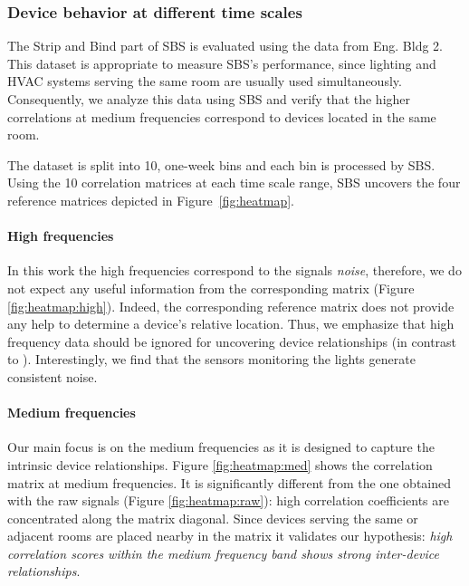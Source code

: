 \subsubsection{Device behavior at different time scales}
The Strip and Bind part of SBS is evaluated using the data from Eng. Bldg 2. %
This dataset is appropriate to measure SBS's performance, since lighting and HVAC systems serving the same room are usually used 
simultaneously.
Consequently, we analyze this data using SBS and verify that the higher correlations at medium frequencies correspond to devices located in the same room. %

The dataset is split into 10, one-week bins and each bin is processed by SBS.
Using the 10 correlation matrices at each time scale range, SBS uncovers the four reference matrices depicted in 
Figure~\ref{fig:heatmap}.

\paragraph{High frequencies}
In this work the high frequencies correspond to the signals \emph{noise}, 
therefore, we do not expect any useful information from the corresponding matrix (Figure \ref{fig:heatmap:high}).
Indeed, the corresponding reference matrix does not provide any help to determine a device's relative location.
Thus, we emphasize that high frequency data should be ignored for uncovering device relationships (in contrast to \cite{romain:iotapp12}).
Interestingly, we find that the sensors monitoring the lights generate consistent noise. %
  
\paragraph{Medium frequencies}
Our main focus is on the medium frequencies as it is designed to capture the intrinsic device relationships.
Figure \ref{fig:heatmap:med} shows the correlation matrix at medium frequencies.
It is significantly different from the one obtained with the raw signals (Figure \ref{fig:heatmap:raw}): high correlation coefficients are concentrated along the matrix diagonal. 
Since devices serving the same or adjacent rooms are placed nearby in the matrix it validates our hypothesis: \emph{high correlation scores within the medium frequency band shows strong inter-device relationships}.

